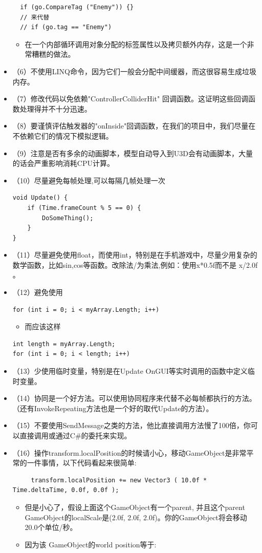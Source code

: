 \documentclass[9pt, b5paper]{article}
\begin{document}
\begin{itemize}
\begin{verbatim}
  if (go.CompareTag ("Enemy")) {}
  // 来代替
  // if (go.tag == "Enemy")
\end{verbatim}
\begin{itemize}
\item 在一个内部循环调用对象分配的标签属性以及拷贝额外内存，这是一个非常糟糕的做法。
\end{itemize}
\item （6）不使用LINQ命令，因为它们一般会分配中间缓器，而这很容易生成垃圾内存。
\item （7）修改代码以免依赖"ControllerColliderHit" 回调函数。这证明这些回调函数处理得并不十分迅速。
\item （8）要谨慎评估触发器的"onInside"回调函数，在我们的项目中，我们尽量在不依赖它们的情况下模拟逻辑。
\item （9）注意是否有多余的动画脚本，模型自动导入到U3D会有动画脚本，大量的话会严重影响消耗CPU计算。
\item （10）尽量避免每帧处理,可以每隔几帧处理一次 
\begin{verbatim}
void Update() { 
    if (Time.frameCount % 5 == 0) { 
        DoSomeThing(); 
    } 
}
\end{verbatim}
\item （11）尽量避免使用float，而使用int，特别是在手机游戏中，尽量少用复杂的数学函数，比如sin,cos等函数。改除法/为乘法,例如：使用x*0.5f而不是 x/2.0f 。
\item （12）避免使用
\begin{verbatim}
for (int i = 0; i < myArray.Length; i++)
\end{verbatim}
\begin{itemize}
\item 而应该这样
\end{itemize}
\begin{verbatim}
int length = myArray.Length;  
for (int i = 0; i < length; i++)  
\end{verbatim}
\item （13）少使用临时变量，特别是在Update OnGUI等实时调用的函数中定义临时变量。
\item （14）协同是一个好方法。可以使用协同程序来代替不必每帧都执行的方法。（还有InvokeRepeating方法也是一个好的取代Update的方法）。
\item （15）不要使用SendMessage之类的方法，他比直接调用方法慢了100倍，你可以直接调用或通过C\#的委托来实现。
\item （16）操作transform.localPosition的时候请小心，移动GameObject是非常平常的一件事情，以下代码看起来很简单:  
\begin{verbatim}
     transform.localPosition += new Vector3 ( 10.0f * Time.deltaTime, 0.0f, 0.0f );
\end{verbatim}
\begin{itemize}
\item 但是小心了，假设上面这个GameObject有一个parent, 并且这个parent GameObject的localScale是(2.0f, 2.0f, 2.0f)。你的GameObject将会移动20.0个单位/秒。
\item 因为该 GameObject的world position等于:
\end{itemize}


\end{itemize}
\end{document}
